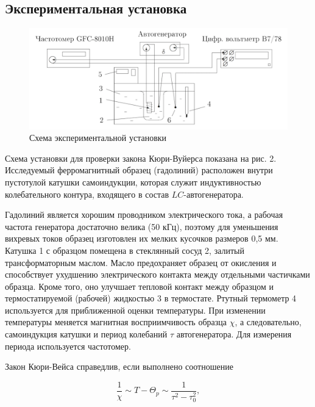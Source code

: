\documentclass[a4paper, 12pt]{article}%
\begin{document}
\subsection*{Экспериментальная установка}

\begin{figure}[h!]
\centering
\includegraphics[width=\linewidth]{images/scheme.png}
\caption{Схема экспериментальной установки}
\label{fig:Image2}
\end{figure}

Схема установки для проверки закона Кюри-Вуйерса показана на рис. 2. Исследуемый ферромагнитный образец (гадолиний) расположен внутри пустотулой катушки самоиндукции, которая служит индуктивностью колебательного контура, входящего в состав $LC$-автогенератора.

\vspace{0.5cm}

Гадолиний является хорошим проводником электрического тока, а рабочая частота генератора достаточно велика (50 кГц), поэтому для уменьшения вихревых токов образец изготовлен их мелких кусочков размеров 0,5 мм. Катушка 1 с образцом помещена в стеклянный сосуд 2, залитый трансформаторным маслом. Масло предохраняет образец от окисления и способствует ухудшению электрического контакта между отдельными частичками образца. Кроме того, оно улучшает тепловой контакт между образцом и термостатируемой (рабочей) жидкостью 3 в термостате. Ртутный термометр 4 используется для приближенной оценки температуры. При изменении температуры меняется магнитная восприимчивость образца $\chi$, а следовательно, самоиндукция катушки и период колебаний $\tau$ автогенератора. Для измерения периода используется частотомер.

\vspace{0.5cm}

Закон Кюри-Вейса справедлив, если выполнено соотношение

\[
\frac{1}{\chi} \sim T - \Theta_p \sim \frac{1}{\tau^2 - \tau_0^2},
\]
\end{document}
